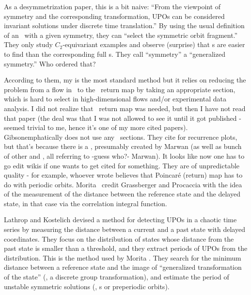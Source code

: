 \begin{description}
As a desymmetrization paper, this is a bit naive: ``From the viewpoint of
symmetry and the corresponding transformation, UPOs can be considered
invariant solutions under discrete time translation.'' By using the usual
definition of an \rpo\ with a given symmetry, they can ``select the
symmetric orbit fragment.'' They only study $C_2$-equivariant examples
and observe (surprise) that \rpo s are easier to find than the
corresponding full \po s. They call ``symmetry'' a ``generalized
symmetry.'' Who ordered that?

											\toCB
According to them, my  is the most standard
method but it relies on reducing the problem from a flow in \statesp\ to
the \Poincare\ return map by taking an appropriate section, which is hard
to select in high-dimensional flows and/or experimental data analysis. I
did not realize that \Poincare\ return map was needed, but then I have
not read that paper (the deal was that I was not allowed to see it until
it got published - seemed trivial to me, hence it's one of my more cited
papers). Gibsonemphatically does not use any \Poincare\
sections. They cite  for recurrence plots, but
that's because there is a
, presumably
created by Marwan\rf{Marw08} (as well as bunch of other
 and
, all referring to -guess
who?- Marwan). It looks like now one has to go edit wikis if one wants to
get cited for something. They are of unpredictable quality -
for example, whoever wrote
believes that Poincar\'e (return) map has to do with periodic orbits.
Morita \etal\ credit Grassberger and Procaccia\rf{GraPro83} with the idea
of the measurement of the distance between the reference state and the
delayed state, in that case via the correlation integral function.

Lathrop and Kostelich devised a method for detecting UPOs in a
chaotic time series by measuring the distance between a current and a
past state with delayed coordinates. They focus on the distribution of
states whose distance from the past state is smaller than a threshold,
and they extract periods of UPOs from the distribution. This is the
method used by Morita \etal. They search for the minimum distance between
a reference state and the image of ``generalized transformation of the
state'' (\ie, a discrete group transformation), and estimate the period
of unstable symmetric solutions (\ie, \rpo s or preperiodic orbits).


\end{description}
